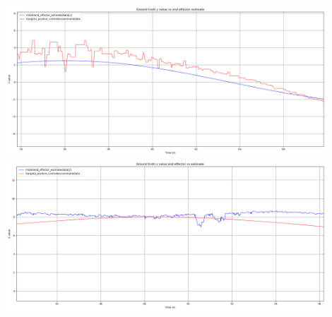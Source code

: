 \includegraphics[width=0.9\textwidth]{plots/closed_y.png} \\
\includegraphics[width=0.9\textwidth]{plots/closed_z.png} \\

\begin{center}
\begin {tabular}{|c||c|c|c|}
\hline
\hline
\end{tabular}
\end{center}
